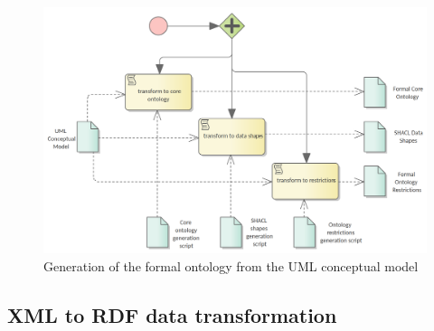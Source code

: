 	\begin{figure}[!ht]		
		\centering
		\includegraphics[width=\textwidth]{../img/formalOntologyGeneration.png}
		\caption{Generation of the formal ontology from the UML conceptual model}
		\label{fig:ontology-generation}
	\end{figure}
	

	\subsection{XML to RDF data transformation}
	\label{sec:xml2rdf}
	

